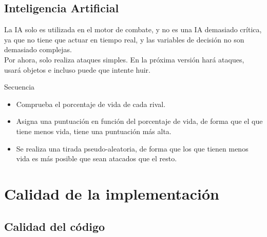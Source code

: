 \documentclass[9pt,xcolor=svgnames]{beamer}
\begin{document}
   \subsection{Inteligencia Artificial}
   \begin{frame}
   \transdissolve

     La IA solo es utilizada en el motor de combate, y no es una IA
     demasiado crítica, ya que no tiene que actuar en tiempo real, y
     las variables de decisión no son demasiado complejas.\\
    \vspace*{0.3cm}
     Por ahora, solo realiza ataques simples. En la próxima versión hará
     ataques, usará objetos e incluso puede que intente huir.\\

     \begin{block}{Secuencia}
       \begin{itemize}
       \item Comprueba el porcentaje de vida de cada rival.
       \item Asigna una puntuación en función del porcentaje de vida,
         de forma que el que tiene menos vida, tiene una puntuación más alta.
       \item Se realiza una tirada pseudo-aleatoria, de forma que los
         que tienen menos vida es más posible que sean atacados que el resto.
       \end{itemize}
     \end{block}
   \end{frame}
   

 \section{Calidad de la implementación}
 
  \subsection{Calidad del código}
  
\end{document}
